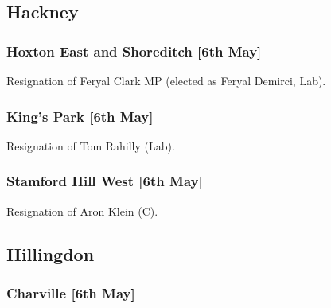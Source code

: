 \documentclass[a4paper,openany]{book}
\begin{document}
\begin{resultsiii}
\subsection*{Hackney}

\subsubsection*{Hoxton East and Shoreditch \hspace*{\fill}\nolinebreak[1]%
	\enspace\hspace*{\fill}
	[6th May]}


Resignation of Feryal Clark MP (elected as Feryal Demirci, Lab).

\subsubsection*{King's Park \hspace*{\fill}\nolinebreak[1]%
	\enspace\hspace*{\fill}
	[6th May]}


Resignation of Tom Rahilly (Lab).

\subsubsection*{Stamford Hill West \hspace*{\fill}\nolinebreak[1]%
	\enspace\hspace*{\fill}
	[6th May]}


Resignation of Aron Klein (C).

\subsection*{Hillingdon}

\subsubsection*{Charville \hspace*{\fill}\nolinebreak[1]%
	\enspace\hspace*{\fill}
	[6th May]}


\end{resultsiii}
\end{document}
